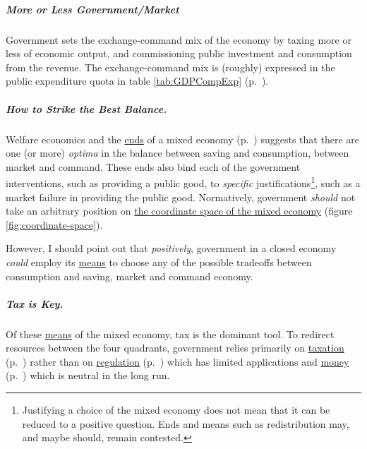 
\subparagraph[Exchange-Command Mix]{More or Less Government/Market} Government sets the exchange-command mix of the economy by taxing more or less of economic output, and commissioning public investment and consumption from the revenue. The exchange-command mix is (roughly) expressed in the public expenditure quota in table \ref{tab:GDPCompExp} (p.~\pageref{tab:GDPCompExp}).

\subparagraph[Optima]{How to Strike the Best Balance.} Welfare economics and the \hyperref[sec:ends]{ends} of a mixed economy (p.~\pageref{sec:ends}) suggests that there are one (or more) \emph{optima} in the balance between saving and consumption, between market and command. These ends also bind each of the government interventions, such as providing a public good, to \emph{specific} justifications\footnote{
	Justifying a choice of the mixed economy does not mean that it can be reduced to a positive question. Ends and means such as redistribution may, and maybe should, remain contested.}, 
such as a market failure in providing the public good. Normatively, government \emph{should} not take an arbitrary position on \hyperref[fig:coordinate-space]{the coordinate space of the mixed economy} (figure \ref{fig:coordinate-space}). 

However, I should point out that \emph{positively}, government in a closed economy \emph{could} employ its \hyperref[sec:means]{means} to choose any of the possible tradeoffs between consumption and saving, market and command economy. 

\subparagraph[Tax is Key]{Tax is Key.} Of these \hyperref[sec:means]{means} of the mixed economy, tax is the dominant tool. To redirect resources between the four quadrants, government relies primarily on \hyperref[sec:fiscal]{taxation} (p.~\pageref{sec:fiscal}) rather than on \hyperref[sec:regulatory]{regulation} (p.~\pageref{sec:regulatory}) which has limited applications and \hyperref[sec:monetary]{money} (p.~\pageref{sec:monetary}) which is neutral in the long run.

